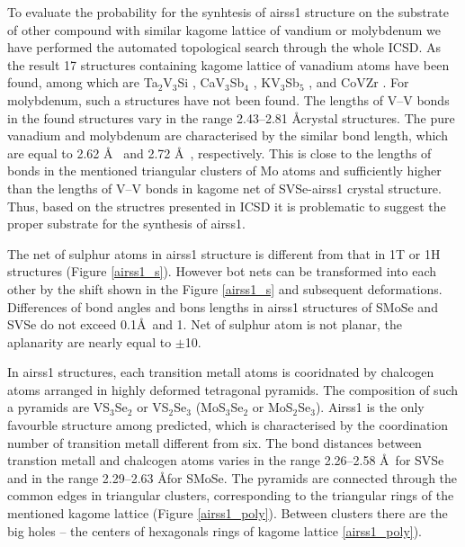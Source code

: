 \documentclass[a4paperm]{article}
\begin{document}
To evaluate the probability for the synhtesis of airss1 structure on the substrate of other compound with similar kagome lattice of vandium or molybdenum we have performed the automated topological search through the whole ICSD.
As the result 17 structures containing kagome lattice of vanadium atoms have been found, among which are Ta$_2$V$_3$Si \cite{Ta2V3Si}, CaV$_3$Sb$_4$ \cite{ CaV3Sb4}, KV$_3$Sb$_5$ \cite{KV3Sb5}, and CoVZr \cite{ZrVCO}.
For molybdenum, such a structures have not been found.
The lengths of V--V bonds in the found structures vary in the range 2.43--2.81 \AA  crystal structures.
The pure vanadium and molybdenum are characterised by the similar bond length, which are equal to 2.62 \AA\ \cite{vanadium} and 2.72 \AA\ \cite{molybdenum}, respectively.
This is close to the lengths of bonds in the mentioned triangular clusters of Mo atoms and sufficiently higher than the lengths of V--V bonds in kagome net of SVSe-airss1 crystal structure.
Thus, based on the structres presented in ICSD it is problematic to suggest the proper substrate for the synthesis of airss1.


The net of sulphur atoms in airss1 structure is different from that in 1T or 1H structures (Figure \ref{airss1_s}).
However bot nets can be transformed into each other by the shift shown in the Figure \ref{airss1_s} and subsequent deformations.
Differences of bond angles and bons lengths in airss1 structures of SMoSe and SVSe do not exceed 0.1\AA\ and 1\textdegree.
Net of sulphur atom is not planar, the aplanarity are nearly equal to $\pm$10\textdegree.

In airss1 structures, each transition metall atoms is cooridnated by  chalcogen atoms arranged in highly deformed tetragonal pyramids.
The composition of such a pyramids are VS$_3$Se$_2$ or VS$_2$Se$_3$ (MoS$_3$Se$_2$ or MoS$_2$Se$_3$).
Airss1 is the only favourble structure among predicted, which is characterised by the coordination number of transition metall different from six.
The bond distances between transtion metall and chalcogen atoms varies in the range 2.26--2.58 \AA\ for SVSe and in the range 2.29--2.63 \AA for SMoSe.
The pyramids are connected through the common edges in triangular clusters, corresponding to the triangular rings of the mentioned kagome lattice (Figure \ref{airss1_poly}).
Between clusters there are the big holes -- the centers of hexagonals rings of kagome lattice \ref{airss1_poly}).
\end{document}
